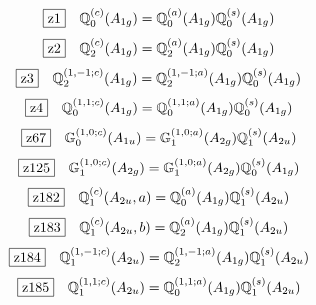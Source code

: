 \documentclass[fleqn,10pt,landscape]{jsarticle}
\begin{document}
\begin{dmath*}
\hspace*{3mm}\fbox{z1}\quad \mathbb{Q}_{0}^{(c)}(A_{1g})=\mathbb{Q}_{0}^{(a)}(A_{1g}) \mathbb{Q}_{0}^{(s)}(A_{1g})
\end{dmath*}
\begin{dmath*}
\hspace*{3mm}\fbox{z2}\quad \mathbb{Q}_{2}^{(c)}(A_{1g})=\mathbb{Q}_{2}^{(a)}(A_{1g}) \mathbb{Q}_{0}^{(s)}(A_{1g})
\end{dmath*}
\begin{dmath*}
\hspace*{3mm}\fbox{z3}\quad \mathbb{Q}_{2}^{(1,-1;c)}(A_{1g})=\mathbb{Q}_{2}^{(1,-1;a)}(A_{1g}) \mathbb{Q}_{0}^{(s)}(A_{1g})
\end{dmath*}
\begin{dmath*}
\hspace*{3mm}\fbox{z4}\quad \mathbb{Q}_{0}^{(1,1;c)}(A_{1g})=\mathbb{Q}_{0}^{(1,1;a)}(A_{1g}) \mathbb{Q}_{0}^{(s)}(A_{1g})
\end{dmath*}
\begin{dmath*}
\hspace*{3mm}\fbox{z67}\quad \mathbb{G}_{0}^{(1,0;c)}(A_{1u})=\mathbb{G}_{1}^{(1,0;a)}(A_{2g}) \mathbb{Q}_{1}^{(s)}(A_{2u})
\end{dmath*}
\begin{dmath*}
\hspace*{3mm}\fbox{z125}\quad \mathbb{G}_{1}^{(1,0;c)}(A_{2g})=\mathbb{G}_{1}^{(1,0;a)}(A_{2g}) \mathbb{Q}_{0}^{(s)}(A_{1g})
\end{dmath*}
\begin{dmath*}
\hspace*{3mm}\fbox{z182}\quad \mathbb{Q}_{1}^{(c)}(A_{2u},a)=\mathbb{Q}_{0}^{(a)}(A_{1g}) \mathbb{Q}_{1}^{(s)}(A_{2u})
\end{dmath*}
\begin{dmath*}
\hspace*{3mm}\fbox{z183}\quad \mathbb{Q}_{1}^{(c)}(A_{2u},b)=\mathbb{Q}_{2}^{(a)}(A_{1g}) \mathbb{Q}_{1}^{(s)}(A_{2u})
\end{dmath*}
\begin{dmath*}
\hspace*{3mm}\fbox{z184}\quad \mathbb{Q}_{1}^{(1,-1;c)}(A_{2u})=\mathbb{Q}_{2}^{(1,-1;a)}(A_{1g}) \mathbb{Q}_{1}^{(s)}(A_{2u})
\end{dmath*}
\begin{dmath*}
\hspace*{3mm}\fbox{z185}\quad \mathbb{Q}_{1}^{(1,1;c)}(A_{2u})=\mathbb{Q}_{0}^{(1,1;a)}(A_{1g}) \mathbb{Q}_{1}^{(s)}(A_{2u})
\end{dmath*}
\end{document}
